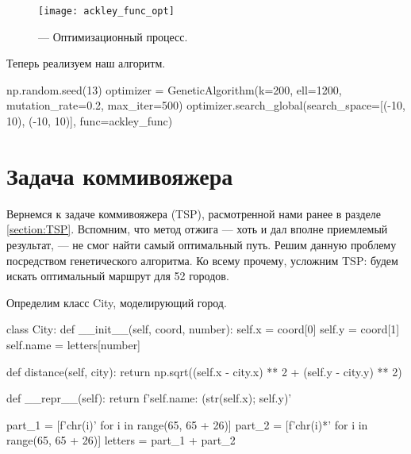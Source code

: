 \begin{figure}[h!!]
\centering
\texttt{[image: ackley\_func\_opt]}
\caption{ --- Оптимизационный процесс.}
\label{img:ackley_func_opt}
\end{figure}

\newpage
Теперь реализуем наш алгоритм.
\begin{pyin}
np.random.seed(13)
optimizer = GeneticAlgorithm(k=200, ell=1200, mutation_rate=0.2,
                             max_iter=500)
optimizer.search_global(search_space=[(-10, 10), (-10, 10)],
                        func=ackley_func)
\end{pyin}





\section{Задача коммивояжера}
\noindent
Вернемся к задаче коммивояжера (TSP), расмотренной нами ранее в разделе \ref{section:TSP}. Вспомним, что метод отжига --- хоть и дал вполне приемлемый результат, --- не смог найти самый оптимальный путь. Решим данную проблему посредством генетического алгоритма. Ко всему прочему, усложним TSP: будем искать оптимальный маршрут для 52 городов.

Определим класс City, моделирующий город.


\begin{pyin}
class City:
  def __init__(self, coord, number):
    self.x = coord[0]
    self.y = coord[1]
    self.name = letters[number]

  def distance(self, city):
    return np.sqrt((self.x - city.x) ** 2 + (self.y - city.y) ** 2)
\end{pyin}

\begin{pyprint}
  def __repr__(self):
    return f'{self.name}: ({str(self.x)}; {self.y})'

part_1 = [f'{chr(i)}' for i in range(65, 65 + 26)]
part_2 = [f'{chr(i)}*' for i in range(65, 65 + 26)]
letters = part_1 + part_2
\end{pyprint}

